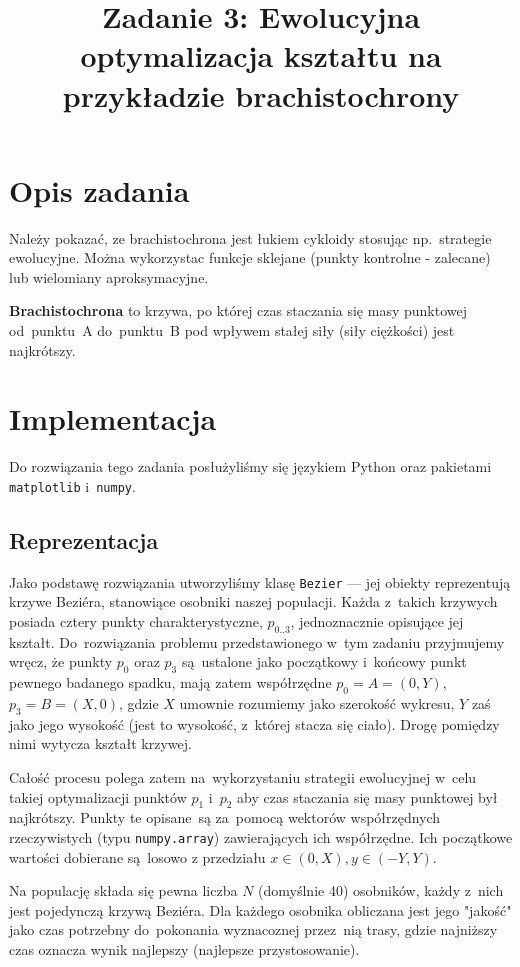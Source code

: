 \documentclass{classrep}
\author{
  \studentinfo{Cezar Pokorski}{138077} \and
  \studentinfo{Artur Czajka}{137971} 
}
\title{Zadanie 3: Ewolucyjna optymalizacja kształtu na przykładzie brachistochrony}
\begin{document}
\maketitle

\section{Opis zadania}
Należy pokazać, ze brachistochrona jest łukiem cykloidy stosując np.~strategie
ewolucyjne. Można wykorzystac funkcje sklejane (punkty kontrolne - zalecane) 
lub wielomiany aproksymacyjne.

\textbf{Brachistochrona} to krzywa, po której czas staczania się masy punktowej od~punktu~A
do~punktu~B pod wpływem stałej siły (siły ciężkości) jest najkrótszy. 



\section{Implementacja}
Do rozwiązania tego zadania posłużyliśmy się językiem Python oraz pakietami \texttt{matplotlib} 
i~\texttt{numpy}. 

\subsection{Reprezentacja}
Jako podstawę rozwiązania utworzyliśmy klasę \texttt{Bezier} --- jej obiekty reprezentują
krzywe Beziéra, stanowiące osobniki naszej populacji. Każda z~takich krzywych posiada cztery
punkty charakterystyczne, $p_{0..3}$, jednoznacznie opisujące jej kształt. Do~rozwiązania
problemu przedstawionego w~tym zadaniu przyjmujemy wręcz, że punkty $p_0$ oraz $p_3$ są~ustalone
jako początkowy i~końcowy punkt pewnego badanego spadku, mają zatem współrzędne $p_0 = A = (0, Y)$,
$p_3 = B = (X, 0)$, gdzie $X$ umownie rozumiemy jako szerokość wykresu, $Y$ zaś jako jego wysokość 
(jest to wysokość, z~której stacza się ciało). Drogę pomiędzy nimi wytycza kształt krzywej.

Całość procesu polega zatem na~wykorzystaniu strategii ewolucyjnej w~celu takiej optymalizacji
punktów $p_1$ i~$p_2$ aby czas staczania się masy punktowej był najkrótszy.  Punkty te opisane~są 
za~pomocą wektorów współrzędnych rzeczywistych (typu \texttt{numpy.array}) zawierających ich
współrzędne. Ich początkowe wartości dobierane są~losowo z przedziału $x\in(0,X), y\in(-Y,Y)$.

Na populację składa się pewna liczba $N$ (domyślnie 40) osobników, każdy z~nich jest pojedynczą
krzywą Beziéra. Dla każdego osobnika obliczana jest jego "jakość" jako czas potrzebny do~pokonania
wyznacoznej przez~nią trasy, gdzie najniższy czas oznacza wynik najlepszy (najlepsze przystosowanie).
\end{document}
